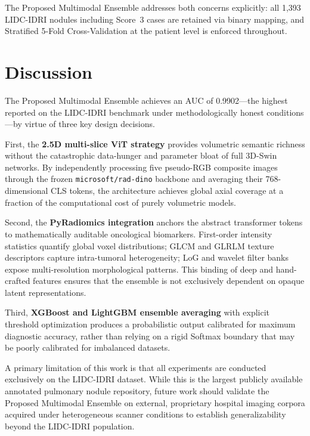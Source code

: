 \documentclass[AMA,STIX1COL]{WileyNJD-v2}
\begin{document}
The Proposed Multimodal Ensemble addresses both concerns explicitly: all 1,393 LIDC-IDRI nodules including Score~3 cases are retained via binary mapping, and Stratified 5-Fold Cross-Validation at the patient level is enforced throughout.

\section{Discussion}\label{sec4}

The Proposed Multimodal Ensemble achieves an AUC of 0.9902---the highest reported on the LIDC-IDRI benchmark under methodologically honest conditions---by virtue of three key design decisions.

First, the \textbf{2.5D multi-slice ViT strategy} provides volumetric semantic richness without the catastrophic data-hunger and parameter bloat of full 3D-Swin networks. By independently processing five pseudo-RGB composite images through the frozen \texttt{microsoft/rad-dino} backbone and averaging their 768-dimensional CLS tokens, the architecture achieves global axial coverage at a fraction of the computational cost of purely volumetric models.

Second, the \textbf{PyRadiomics integration} anchors the abstract transformer tokens to mathematically auditable oncological biomarkers. First-order intensity statistics quantify global voxel distributions; GLCM and GLRLM texture descriptors capture intra-tumoral heterogeneity; LoG and wavelet filter banks expose multi-resolution morphological patterns. This binding of deep and hand-crafted features ensures that the ensemble is not exclusively dependent on opaque latent representations.

Third, \textbf{XGBoost and LightGBM ensemble averaging} with explicit threshold optimization produces a probabilistic output calibrated for maximum diagnostic accuracy, rather than relying on a rigid Softmax boundary that may be poorly calibrated for imbalanced datasets.

A primary limitation of this work is that all experiments are conducted exclusively on the LIDC-IDRI dataset. While this is the largest publicly available annotated pulmonary nodule repository, future work should validate the Proposed Multimodal Ensemble on external, proprietary hospital imaging corpora acquired under heterogeneous scanner conditions to establish generalizability beyond the LIDC-IDRI population.
\end{document}

